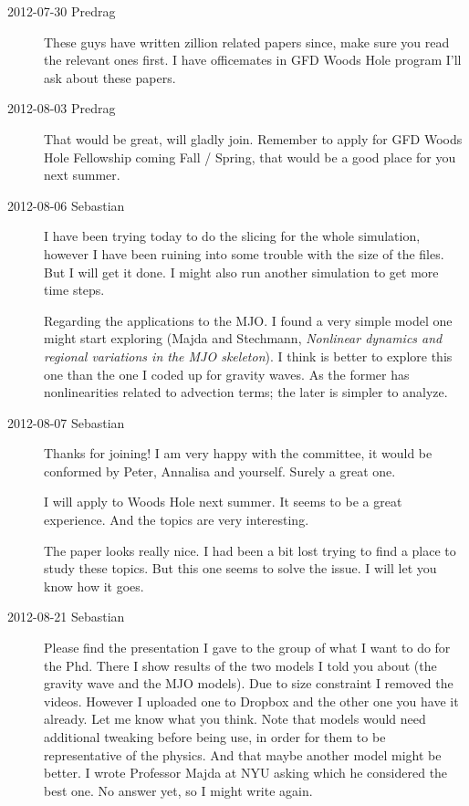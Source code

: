 \begin{description}
\item[2012-07-30 Predrag] These guys have written zillion related papers
since, make sure you read the relevant ones first. I have officemates in
GFD Woods Hole program I'll ask about these papers.

\item[2012-08-03 Predrag] That would be great, will gladly join. Remember to
apply for GFD Woods Hole Fellowship coming Fall / Spring, that would be
a good place for you next summer.

\item[2012-08-06 Sebastian]
I have been trying today to do the slicing for the whole simulation,
however I have been ruining into some trouble with the size of the files.
But I will get it done. I might also run another simulation to get more
time steps.

Regarding the applications to the MJO. I found a very simple model one
might start exploring (Majda and Stechmann, \emph{Nonlinear
dynamics and regional variations in the {MJO} skeleton}). I think is
better to explore this one than the one I coded up for gravity waves. As
the former has nonlinearities related to advection terms; the later is
simpler to analyze.

\item[2012-08-07 Sebastian]
Thanks for joining! I am very happy with the committee, it would be conformed
by Peter, Annalisa and yourself. Surely a great one.

I will apply to Woods Hole next summer. It seems to be a great experience.
And the topics are very interesting.

The paper looks really nice. I had been a bit lost trying to find a place
to study these topics. But this one seems to solve the issue. I will let
you know how it goes.

\item[2012-08-21 Sebastian]
Please find the 
{presentation} I gave to the group of what I want to do for the Phd.
There I show results of the two models I told you about (the gravity wave
and the MJO models). Due to size constraint I removed the videos. However
I uploaded one to Dropbox and the other one you have it already. Let me
know what you think. Note that models would need additional tweaking
before being use, in order for them to be representative of the physics.
And that maybe another model might be better. I wrote Professor Majda at
NYU asking which he considered the best one. No answer yet, so I might
write again.


\end{description}

